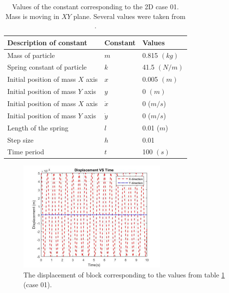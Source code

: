  \begin{table}[hbt!]
\begin{center}
    \begin{tabular}{p{6cm}|p{2cm}|p{3cm}}
    \hline
    \textbf{Description of constant} & \textbf{Constant} & \textbf{Values}
    \\
    \hline \hline
    Mass of particle  & $m$ & 0.815 $(kg)$\\
      Spring constant of particle  & $k$ & 41.5 $(N/m)$\\
     Initial position of mass $X$ axis & $x$ & 0.005 $(m)$ \\
     Initial position of mass $Y$ axis  & $y$ & 0 $(m)$  \\
     Initial position of mass $X$ axis & $\dot{x}$ & 0 ($m/s$) \\
     Initial position of mass $Y$ axis & $\dot{y}$ & 0 ($m/s$)  \\
     Length of the spring & $l$ & 0.01 ($m$) \\
     Step size & $h$ & 0.01  \\
     Time period & $t$ & 100 $(s)$ \\
     \hline
    \end{tabular}
    \caption{Values of the constant corresponding to the  2D case 01. Mass is moving in $XY$ plane. Several values were taken from \cite{JETIRRes28:online}. }
    \label{tab2D1}
    \end{center}
\end{table}

\newpage 

 \begin{figure}[hbt!]
	\centering
	\begin{framed}
	\includegraphics[width=0.66\textwidth]{Figures/2DD.jpg}
		\end{framed}
	\caption{ The displacement of block corresponding to the values from table \ref{tab2D1} (case 01). }
	\label{fig:R5}
\end{figure}

